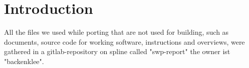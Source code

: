 \section{Introduction}

All the files we used while porting that are not used for building, such as documents,
source code for working software, instructions and overviews, were gathered in a
gitlab-repository on spline called "swp-report" the owner ist "backenklee".
